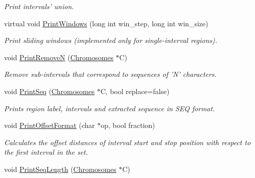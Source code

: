 \begin{CompactItemize}
\begin{CompactList}\small\item\em Print intervals' union. \item\end{CompactList}\item 
\hypertarget{classGenomicRegion_3962ea71432f3977b1ac501e4e878480}{
virtual void \hyperlink{classGenomicRegion_3962ea71432f3977b1ac501e4e878480}{PrintWindows} (long int win\_\-step, long int win\_\-size)}
\label{classGenomicRegion_3962ea71432f3977b1ac501e4e878480}

\begin{CompactList}\small\item\em Print sliding windows (implemented only for single-interval regions). \item\end{CompactList}\item 
\hypertarget{classGenomicRegion_a2a5b753401e9f9d64a30cfbbdf23f60}{
void \hyperlink{classGenomicRegion_a2a5b753401e9f9d64a30cfbbdf23f60}{PrintRemoveN} (\hyperlink{classChromosomes}{Chromosomes} $\ast$C)}
\label{classGenomicRegion_a2a5b753401e9f9d64a30cfbbdf23f60}

\begin{CompactList}\small\item\em Remove sub-intervals that correspond to sequences of 'N' characters. \item\end{CompactList}\item 
\hypertarget{classGenomicRegion_4b52d78052e0109b1fceafe450cfdedd}{
void \hyperlink{classGenomicRegion_4b52d78052e0109b1fceafe450cfdedd}{PrintSeq} (\hyperlink{classChromosomes}{Chromosomes} $\ast$C, bool replace=false)}
\label{classGenomicRegion_4b52d78052e0109b1fceafe450cfdedd}

\begin{CompactList}\small\item\em Prints region label, intervals and extracted sequence in SEQ format. \item\end{CompactList}\item 
void \hyperlink{classGenomicRegion_33d1e5544b3fb81e8c19468b91920b1d}{PrintOffsetFormat} (char $\ast$op, bool fraction)
\begin{CompactList}\small\item\em Calculates the offset distances of interval start and stop position with respect to the first interval in the set. \item\end{CompactList}\item 
\hypertarget{classGenomicRegion_7a8ac4f469447256253bdbdcb1b4a956}{
void \hyperlink{classGenomicRegion_7a8ac4f469447256253bdbdcb1b4a956}{PrintSeqLength} (\hyperlink{classChromosomes}{Chromosomes} $\ast$C)}
\label{classGenomicRegion_7a8ac4f469447256253bdbdcb1b4a956}


\end{CompactItemize}
